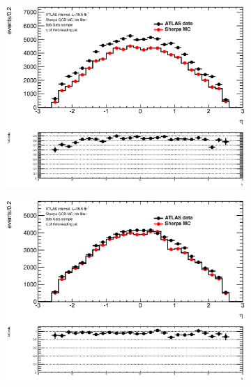 \begin{figure}[phtb!]
  \begin{center}
  \begin{subfigure}[$bbb$ 3 jet category]{0.3\textwidth}\includegraphics[width=\textwidth]{MonteCarlo/figures/eta2_bbb_3jets.eps}\end{subfigure}
  \begin{subfigure}[$bbb$ 4 jet category]{0.3\textwidth}\includegraphics[width=\textwidth]{MonteCarlo/figures/eta2_bbb_4jets.eps}\end{subfigure}

\end{center}
\end{figure}
